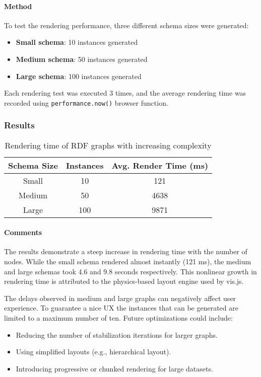 \paragraph{Method}
To test the rendering performance, three different schema sizes were generated:
\begin{itemize}
    \item \textbf{Small schema}: 10 instances generated
    \item \textbf{Medium schema}: 50 instances generated
    \item \textbf{Large schema}: 100 instances generated
\end{itemize}

Each rendering test was executed 3 times, and the average rendering time was recorded using \texttt{performance.now()} browser function.

\subsubsection{Results}

\begin{table}[H]
\centering
\begin{tabular}{|c|c|c|}
\hline
\textbf{Schema Size} & \textbf{Instances} & \textbf{Avg. Render Time (ms)} \\ \hline
Small & 10 & 121 \\ \hline
Medium & 50 & 4638 \\ \hline
Large & 100 & 9871 \\ \hline
\end{tabular}
\caption{Rendering time of RDF graphs with increasing complexity}
\label{tab:rendering-times}
\end{table}

\paragraph{Comments}
The results demonstrate a steep increase in rendering time with the number of nodes. While the small schema rendered almost instantly (121 ms), the medium and large schemas took 4.6 and 9.8 seconds respectively. This nonlinear growth in rendering time is attributed to the physics-based layout engine used by vis.js.

The delays observed in medium and large graphs can negatively affect user experience. To guarantee a nice UX the instances that can be generated are limited to a maximum number of ten. Future optimizations could include:
\begin{itemize}
    \item Reducing the number of stabilization iterations for larger graphs.
    \item Using simplified layouts (e.g., hierarchical layout).
    \item Introducing progressive or chunked rendering for large datasets.
\end{itemize}



